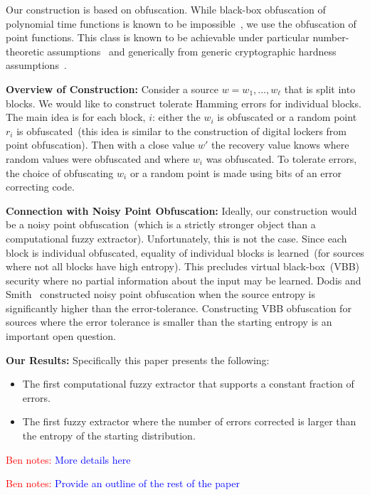 \documentclass[11pt]{article}
\newcommand{\authnote}[2]{{\textcolor{red}{\textsf{#1 notes: }\textcolor{blue}{ #2}}\marginpar{\textcolor{red}{\textbf{!!!!!}}}}}
\newcommand{\authnote}[2]{}
\newcommand{\bnote}[1]{{\authnote{Ben}{#1}}}
\begin{document}
Our construction is based on obfuscation.  While black-box obfuscation of polynomial time functions is known to be impossible~\cite{barak2001possibility}, we use the obfuscation of point functions.  This class is known to be achievable under particular number-theoretic assumptions~\cite{canetti1997towards} and generically from generic cryptographic hardness assumptions~\cite{wee2005obfuscating}.  

\textbf{Overview of Construction:}  Consider a source $w = w_1,..., w_\ell$ that is split into blocks.  We would like to construct tolerate Hamming errors for individual blocks.  The main idea is for each block, $i$: either the $w_i$ is obfuscated or a random point $r_i$ is obfuscated~(this idea is similar to the construction of digital lockers from point obfuscation).  Then with a close value $w'$ the recovery value knows where random values were obfuscated and where $w_i$ was obfuscated.  To tolerate errors, the choice of obfuscating $w_i$ or a random point is made using bits of an error correcting code.

\textbf{Connection with Noisy Point Obfuscation: } Ideally, our construction would be a noisy point obfuscation~(which is a strictly stronger object than a computational fuzzy extractor).  Unfortunately, this is not the case.  Since each block is individual obfuscated, equality of individual blocks is learned~(for sources where not all blocks have high entropy).  This precludes virtual black-box~(VBB) security where no partial information about the input may be learned.  Dodis and Smith~\cite{DBLP:conf/stoc/DodisS05} constructed noisy point obfuscation when the source entropy is significantly higher than the error-tolerance.  Constructing VBB obfuscation for sources where the error tolerance is smaller than the starting entropy is an important open question.

\textbf{Our Results:} Specifically this paper presents the following:
\begin{itemize}
\item The first computational fuzzy extractor that supports a constant fraction of errors.
\item The first fuzzy extractor where the number of errors corrected is larger than the entropy of the starting distribution.
\end{itemize}
\bnote{More details here}

\bnote{Provide an outline of the rest of the paper}
\end{document}
